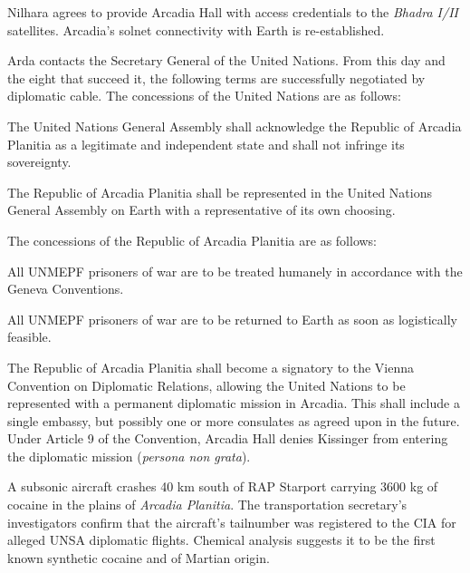 Nilhara agrees to provide Arcadia Hall with access credentials to the {\it Bhadra I/II} satellites. Arcadia's solnet connectivity with Earth is re-established.

Arda contacts the Secretary General of the United Nations. From this day and the eight that succeed it, the following terms are successfully negotiated by diplomatic cable. The concessions of the United Nations are as follows:
\startitemize[n]
\item The United Nations General Assembly shall acknowledge the Republic of Arcadia Planitia as a legitimate and independent state and shall not infringe its sovereignty.
\item The Republic of Arcadia Planitia shall be represented in the United Nations General Assembly on Earth with a representative of its own choosing.
\stopitemize

The concessions of the Republic of Arcadia Planitia are as follows:
\startitemize[n]
\item All UNMEPF prisoners of war are to be treated humanely in accordance with the Geneva Conventions.
\item All UNMEPF prisoners of war are to be returned to Earth as soon as logistically feasible.
\item The Republic of Arcadia Planitia shall become a signatory to the Vienna Convention on Diplomatic Relations, allowing the United Nations to be represented with a permanent diplomatic mission in Arcadia. This shall include a single embassy, but possibly one or more consulates as agreed upon in the future. Under Article 9 of the Convention, Arcadia Hall denies Kissinger from entering the diplomatic mission ({\it persona non grata}).
\stopitemize
\StopTimelineDate

A subsonic aircraft crashes 40 km south of RAP Starport carrying 3600 kg of cocaine in the plains of {\it Arcadia Planitia}. The transportation secretary's investigators confirm that the aircraft's tailnumber was registered to the CIA for alleged UNSA diplomatic flights. Chemical analysis suggests it to be the first known synthetic cocaine and of Martian origin.
\StopTimelineDate






